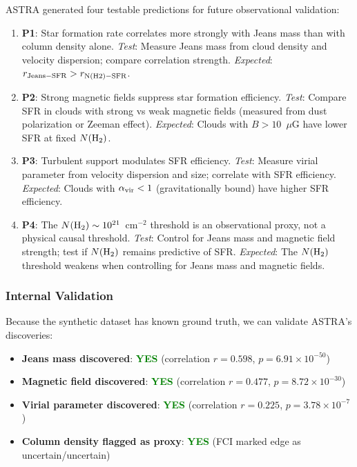 \documentclass[usenatbib]{rasti}
\begin{document}
ASTRA generated four testable predictions for future observational validation:

\begin{enumerate}
\item \textbf{P1}: Star formation rate correlates more strongly with Jeans mass than with column density alone. \textit{Test}: Measure Jeans mass from cloud density and velocity dispersion; compare correlation strength. \textit{Expected}: $r_{\rm Jeans-SFR} > r_{\rm N(H2)-SFR}$.

\item \textbf{P2}: Strong magnetic fields suppress star formation efficiency. \textit{Test}: Compare SFR in clouds with strong vs weak magnetic fields (measured from dust polarization or Zeeman effect). \textit{Expected}: Clouds with $B > 10$~$\mu$G have lower SFR at fixed $N({\rm H_2})$.

\item \textbf{P3}: Turbulent support modulates SFR efficiency. \textit{Test}: Measure virial parameter from velocity dispersion and size; correlate with SFR efficiency. \textit{Expected}: Clouds with $\alpha_{\rm vir} < 1$ (gravitationally bound) have higher SFR efficiency.

\item \textbf{P4}: The $N({\rm H_2}) \sim 10^{21}$~cm$^{-2}$ threshold is an observational proxy, not a physical causal threshold. \textit{Test}: Control for Jeans mass and magnetic field strength; test if $N({\rm H_2})$ remains predictive of SFR. \textit{Expected}: The $N({\rm H_2})$ threshold weakens when controlling for Jeans mass and magnetic fields.
\end{enumerate}

\subsubsection{Internal Validation}

Because the synthetic dataset has known ground truth, we can validate ASTRA's discoveries:

\begin{itemize}
\item \textbf{Jeans mass discovered}: \textcolor{green}{\textbf{YES}} (correlation $r=0.598$, $p=6.91\times10^{-50}$)
\item \textbf{Magnetic field discovered}: \textcolor{green}{\textbf{YES}} (correlation $r=0.477$, $p=8.72\times10^{-30}$)
\item \textbf{Virial parameter discovered}: \textcolor{green}{\textbf{YES}} (correlation $r=0.225$, $p=3.78\times10^{-7}$)
\item \textbf{Column density flagged as proxy}: \textcolor{green}{\textbf{YES}} (FCI marked edge as uncertain/uncertain)
\end{itemize}
\end{document}
